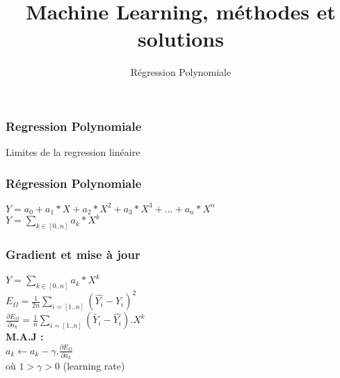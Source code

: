 \documentclass{formation}
\title{Machine Learning, méthodes et solutions}
\subtitle{Régression Polynomiale}
\begin{document}
\maketitle


\begin{frame}
  \frametitle{Regression Polynomiale}
  Limites de la regression linéaire
\end{frame}

\begin{frame}
  \frametitle{Régression Polynomiale}
  $Y=a_0+a_1*X+a_2*X^2+a_3*X^3+...+a_n*X^n$ \\
  \newline
  $Y=\underset{k \in [0..n]}{\sum}{a_k*X^k}$
\end{frame}

\begin{frame}
  \frametitle{Gradient et mise à jour}
  $Y=\underset{k \in [0..n]}{\sum}{a_k*X^k}$ \\
  $\;$ \\
  $E_{\Omega} = \frac{1}{2n}\underset{i=[1..n]}{\sum}( \hat{Y_i} - Y_i )^2$ \\
  $\;$ \\
  $\frac{\partial{E_{\Omega}}}{\partial{a_k}} = \frac{1}{n}\underset{i=[1..n]}{\sum}(\tilde{Y_i} - \hat{Y_i}).X^k$ \\
  $\;$ \\
  $\;$ \\
  \textbf{M.A.J :} \\
  $\;$ \\
  $a_k \leftarrow a_k - \gamma.\frac{\partial{E_{\Omega}}}{\partial{a_k}}$ \\
  $\;$ \\
  où $1 > \gamma > 0$ (learning rate)
\end{frame}
\end{document}
